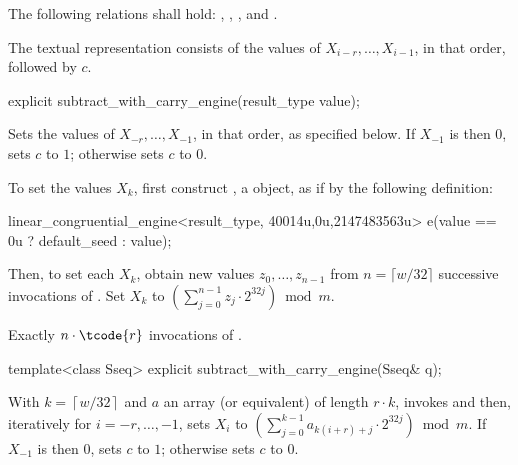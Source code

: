 \pnum
The following relations shall hold:
  ,
  ,
  ,
and
  .

\pnum
The textual representation
consists of the values of
 $X_{i-r}, \dotsc, X_{i-1}$,
in that order, followed by $c$.

%
\begin{itemdecl}
explicit subtract_with_carry_engine(result_type value);
\end{itemdecl}

\begin{itemdescr}
\pnum
\effects
 Sets the values of
 $X_{-r}, \dotsc, X_{-1}$,
 in that order, as specified below.
 If $X_{-1}$ is then $0$,
 sets $c$ to $1$;
 otherwise sets $c$ to $0$.

 To set the values $X_k$,
 first construct , a  object,
 as if by the following definition:
\begin{codeblock}
linear_congruential_engine<result_type,
                          40014u,0u,2147483563u> e(value == 0u ? default_seed : value);
\end{codeblock}
 Then, to set each $X_k$,
 obtain new values $z_0, \dotsc, z_{n-1}$
 from $n = \lceil w/32 \rceil$ successive invocations
 of .
 Set $X_k$ to $\left( \sum_{j=0}^{n-1} z_j \cdot 2^{32j}\right) \bmod m$.

\pnum
\complexity
Exactly $n \cdot \tcode{r}$ invocations
 of .
\end{itemdescr}

%
\begin{itemdecl}
template<class Sseq> explicit subtract_with_carry_engine(Sseq& q);
\end{itemdecl}

\begin{itemdescr}
\pnum
\effects
 With
 $k = \left\lceil w / 32 \right\rceil$
 and $a$ an array (or equivalent)
 of length $r \cdot k$,
 invokes 
 and then, iteratively for $i = -r, \dotsc, -1$,
 sets $X_i$
 to $ \left(\sum_{j=0}^{k-1}a_{k(i+r)+j} \cdot 2^{32j} \right) \bmod m $.
 If $X_{-1}$ is then $0$,
 sets $c$ to $1$;
 otherwise sets $c$ to $0$.
\end{itemdescr}




